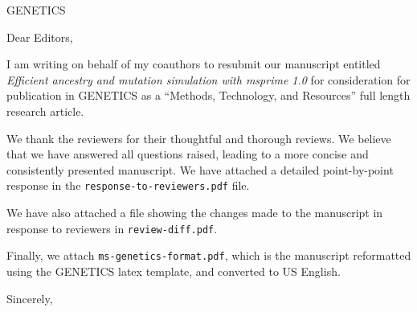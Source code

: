 \documentclass{letter}
\begin{document}
\begin{letter}{GENETICS}

\opening{Dear Editors,}

I am writing on behalf of my coauthors to resubmit our manuscript entitled
\emph{Efficient ancestry and mutation simulation with msprime 1.0}
for consideration for publication in GENETICS
as a ``Methods, Technology, and Resources'' full length research article.

We thank the reviewers for their thoughtful and thorough reviews. We
believe that we have answered all questions raised, leading to a more
concise and consistently presented manuscript. We have attached
a detailed point-by-point response in the \texttt{response-to-reviewers.pdf}
file.

We have also attached a file showing the changes made to the manuscript
in response to reviewers in \texttt{review-diff.pdf}.

Finally, we attach \texttt{ms-genetics-format.pdf}, which is the manuscript
reformatted using the GENETICS latex template, and converted to US English.

\closing{Sincerely,}

\end{letter}
\end{document}
